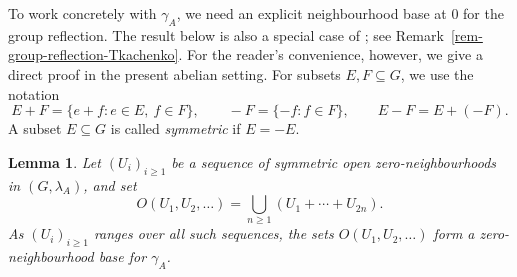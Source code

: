 \documentclass[preprint,3p]{elsarticle}
\theoremstyle{plain}
\newtheorem{lem}[thm]{Lemma}
\theoremstyle{definition}
\numberwithin{equation}{section}
\begin{document}
To work concretely with $\gamma_A$, we need an explicit
neighbourhood base at $0$ for the group reflection.  The result below
is also a special case of \cite[Lemma~11]{Tkachenko2013}; see
Remark~\ref{rem-group-reflection-Tkachenko}.  For the reader's
convenience, however, we give a direct proof in the present abelian
setting.
For subsets $E,F\subseteq G$, we use the notation
\[
E+F=\{e+f:e\in E,\ f\in F\},\qquad
-F=\{-f:f\in F\},\qquad
E-F=E+(-F).
\]
A subset $E\subseteq G$ is called \emph{symmetric} if $E=-E$.

\begin{lem}
\label{lem-group-reflection-base}
Let $(U_i)_{i\geq1}$ be a sequence of symmetric open
zero-neighbourhoods in $(G,\lambda_A)$, and set
\begin{equation}
\label{eq-group-reflection-base}
 O(U_1,U_2,\ldots)
 =
 \bigcup_{n\geq1}(U_1+\cdots+U_{2n}).
\end{equation}
As $(U_i)_{i\geq1}$ ranges over all such sequences, the sets
$O(U_1,U_2,\ldots)$ form a zero-neighbourhood base for $\gamma_A$.
\end{lem}
\end{document}
